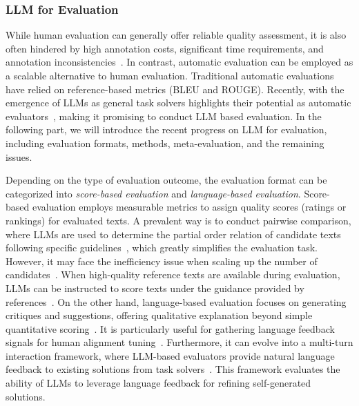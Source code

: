{\subsubsection{LLM for Evaluation} 
{
While human evaluation can generally offer reliable quality assessment, it is also often hindered by high annotation costs, significant time requirements, and annotation inconsistencies~\cite{Karpinska-arxiv-23-The}.
In contrast, automatic evaluation can be employed  as a scalable alternative to human evaluation. 
Traditional automatic evaluations have relied on reference-based metrics (\eg BLEU and ROUGE). 
Recently, with the emergence of LLMs as general task solvers highlights their potential as automatic evaluators~\cite{Zheng-2023-arxiv-Judging,Wang-2023-arxiv-Large}, making it promising to conduct LLM based evaluation.
In the following part, we will introduce the recent progress on LLM for evaluation, including evaluation formats, methods, meta-evaluation, and the remaining issues. 
}

{
Depending on the type of evaluation outcome, the evaluation format can be categorized into \emph{score-based evaluation} and \emph{language-based evaluation}.
Score-based evaluation employs measurable metrics to assign quality scores (\eg ratings or rankings)  for evaluated texts.
A prevalent way is to conduct pairwise comparison, where LLMs are used to determine the partial order relation of candidate texts following specific guidelines~\cite{Peng-23-arxiv-Instruction,Zheng-2023-arxiv-Judging,Wang-2023-arxiv-Large}, which greatly simplifies the evaluation task.  
However, it may face the inefficiency issue when scaling up the number of candidates~\cite{Zheng-2023-arxiv-Judging}.
{When high-quality reference texts are available during evaluation, LLMs can be instructed to score texts under the guidance provided by references~\cite{Zheng-2023-arxiv-Judging,Wang-arxiv-2023-SciBench,Sawada-arxiv-2023-ARB}.} 
On the other hand, language-based evaluation focuses on generating critiques and suggestions, offering qualitative explanation beyond simple quantitative scoring~\cite{Bai-arXiv-2022-Constitutional,Lee-23-arxiv-RLAIF,Wang-23-arxiv-Shepherd,Cui-23-arxiv-UltraFeedback}. 
It is particularly useful for gathering language feedback signals for human alignment tuning~\cite{Bai-arXiv-2022-Constitutional,Lee-23-arxiv-RLAIF}. 
{Furthermore, it can evolve into a multi-turn interaction framework, where LLM-based evaluators provide natural language feedback to existing solutions from task solvers~\cite{Wang-23-arxiv-MINT}.
This framework evaluates the ability of LLMs to leverage language feedback for refining self-generated solutions. 
}

}}
